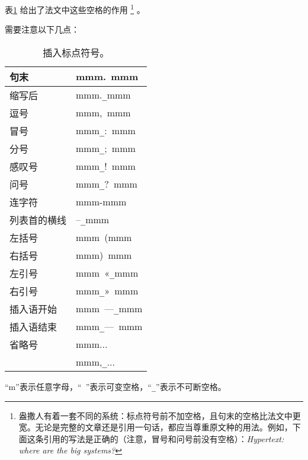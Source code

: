 表\ref{tab1} 给出了法文中这些空格的作用
    \footnote{盎撒人有着一套不同的系统：标点符号前不加空格，且句末的空格比法文中更宽。无论是完整的文章还是引用一句话，都应当尊重原文种的用法。例如，下面这条引用的写法是正确的（注意，冒号和问号前没有空格）：\emph{Hypertext: where are the big systems?}}
。

需要注意以下几点：

\begin{table}
    \begin{center}
        \begin{tabular}{|l|l|}
            \hline
            句末 & mmm.\verb*| |mmm\\
            \hline
            缩写后 & mmm.\verb|_|mmm\\
            \hline
            逗号 & mmm,\verb*| |mmm\\
            \hline
            冒号 & mmm\verb|_|:\verb*| |mmm\\
            \hline
            分号 & mmm\verb|_|;\verb*| |mmm\\
            \hline
            感叹号 & mmm\verb|_|!\verb*| |mmm\\
            \hline
            问号 & mmm\verb|_|?\verb*| |mmm\\
            \hline
            连字符 & mmm-mmm\\
            \hline
            列表首的横线 & --\verb|_|mmm\\
            \hline
            左括号 & mmm\verb*| |(mmm\\
            右括号 & mmm)\verb*| |mmm\\
            \hline
            左引号 & mmm\verb*| |«\verb|_|mmm\\
            右引号 & mmm\verb|_|»\verb*| |mmm\\
            \hline
            插入语开始 & mmm\verb*| |---\verb|_|mmm\\
            插入语结束 & mmm\verb|_|---\verb*| |mmm\\
            \hline
            省略号 & mmm...\\
            & mmm,\verb|_|...\\
            \hline
        \end{tabular}
        \caption{插入标点符号。}
        \label{tab1}
        ``m''表示任意字母，``\verb*| |''表示可变空格，``\verb|_|''表示不可断空格。
    \end{center}
\end{table}


